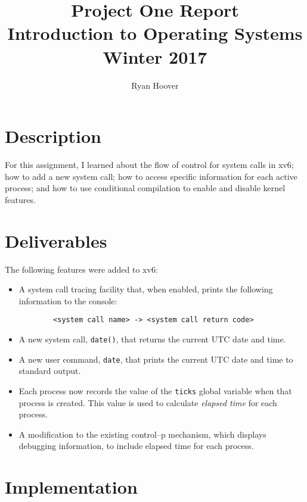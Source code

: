 \documentclass[11pt,letterpaper]{report}
\author{Ryan Hoover}
\title{Project One Report\\Introduction to Operating Systems\\ Winter 2017}
\date{}
\begin{document}

	\section*{Description}
	For this assignment, I learned about the flow of control for  system calls in xv6; how to add a new system call; how to access specific information for each active process; and how to use conditional compilation to enable and disable kernel features. \\
	
	\section*{Deliverables}
	The following features were added to xv6:
	
	\begin{itemize}
	
	\item A system call tracing facility that, when enabled, prints the following information to the console:
	\begin{verbatim}
		<system call name> -> <system call return code>
	\end{verbatim}
	
	
	\item A new system call, {\tt date()}, that returns the current UTC date and time. %
	
	\item A new user command, {\tt date}, that prints  the current UTC date and time to standard output.
	
	\item Each process now records the value of the {\tt ticks} global variable when that process is created. This value is used to calculate \emph{elapsed time} for each process.
	
	\item A modification to the existing control--p mechanism, which displays debugging information, to  include  elapsed time for each process.
	
	\end{itemize}

\newpage	
	\section*{Implementation}
	
\end{document}
